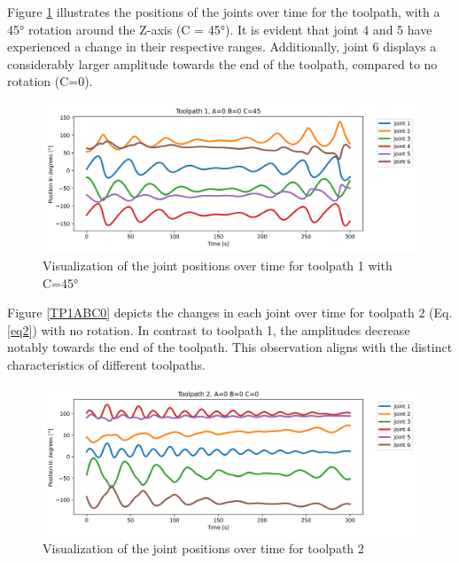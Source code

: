 Figure \ref{TP1ABC45} illustrates the positions of the joints over time for the toolpath, with a 45° rotation around the Z-axis (C = 45°). It is evident that joint 4 and 5 have experienced a change in their respective ranges. Additionally, joint 6 displays a considerably larger amplitude towards the end of the toolpath, compared to no rotation (C=0).

\begin{figure}[H]
	\centerline{\includegraphics[width=1\textwidth]{figures/TP1ABC45.png}}
	\caption{Visualization of the joint positions over time for toolpath 1 with C=45°}
	\label{TP1ABC45}
\end{figure}



Figure \ref{TP1ABC0} depicts the changes in each joint over time for toolpath 2 (Eq. \ref{eq2}) with no rotation. In contrast to toolpath 1, the amplitudes decrease notably towards the end of the toolpath. This observation aligns with the distinct characteristics of different toolpaths.
 
\begin{figure}[H]
	\centerline{\includegraphics[width=1\textwidth]{figures/TP2ABC0.png}}
	\caption{Visualization of the joint positions over time for toolpath 2}
	\label{TP2ABC0}
\end{figure}


